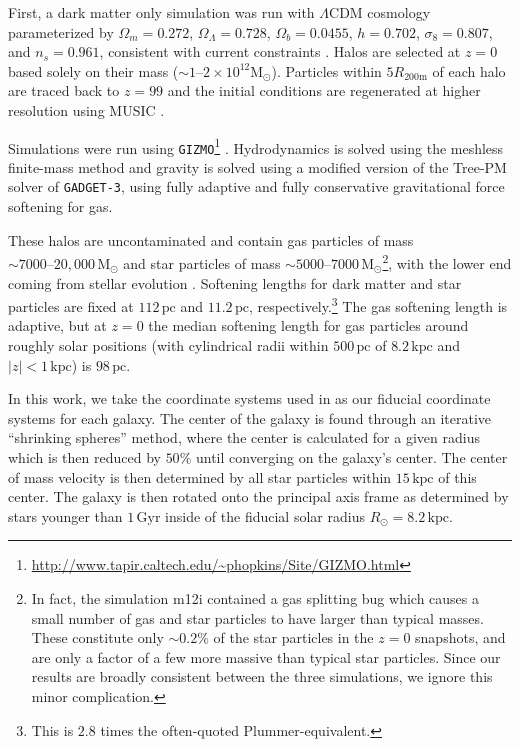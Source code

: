 \documentclass[twocolumn]{aastex62}
\newcommand{\Msun}{\text{M}_\odot}
\newcommand{\pc}{\text{pc}}
\newcommand{\kpc}{\text{kpc}}
\newcommand{\Gyr}{\text{Gyr}}
\newcommand{\abs}[1]{\left| #1 \right|}
\newcommand{\z}{z}
\begin{document}
First, a dark matter only simulation was run with $\Lambda$CDM cosmology
parameterized by $\Omega_m = 0.272$, $\Omega_{\Lambda} = 0.728$, $\Omega_b =
0.0455$, $h = 0.702$, $\sigma_8 = 0.807$, and $n_s = 0.961$, consistent with
current constraints \citep{2018arXiv180706209P}. Halos are selected at $z=0$
based solely on their mass ($\sim 1\text{--}2 \times 10^{12} \Msun$).
Particles within $5 R_{200\text{m}}$ of each halo are traced back to $\z=99$
and the initial conditions are regenerated at higher resolution using MUSIC
\citep{2011MNRAS.415.2101H}.

Simulations were run using
\texttt{GIZMO}\footnote{\url{http://www.tapir.caltech.edu/~phopkins/Site/GIZMO.html}}
\citep{2015MNRAS.450...53H}. Hydrodynamics is solved using the meshless
finite-mass method and gravity is solved using a modified version of the
Tree-PM solver of \texttt{GADGET-3}, using fully adaptive and fully
conservative gravitational force softening for gas.

These halos are uncontaminated and contain gas particles of mass $\sim 7000
\text{--} 20,000\,\Msun$ and star particles of mass $\sim 5000 \text{--} 7000\,
\Msun$\footnote{In fact, the simulation m12i contained a gas
splitting bug which causes a small number of gas and star particles to have
larger than typical masses. These constitute only $\sim0.2\%$ of the star
particles in the $z=0$ snapshots, and are only a factor of a few more massive
than typical star particles. Since our results are broadly consistent between
the three simulations, we ignore this minor complication.}, with the lower end
coming from stellar evolution \citep{2018arXiv180610564S}. Softening lengths
for dark matter and star particles are fixed at $112\,\pc$ and $11.2\,\pc$,
respectively.\footnote{This is $2.8$ times the often-quoted
Plummer-equivalent.} The gas softening length is adaptive, but at $z=0$ the
median softening length for gas particles around roughly solar positions (with
cylindrical radii within $500\,\pc$ of $8.2\,\kpc$ and $\abs{z}<1\,\kpc$) is
$98\,\pc$.

In this work, we take the coordinate systems used in
\citet{2018arXiv180610564S} as our fiducial coordinate systems for each
galaxy. The center of the galaxy is found through an iterative ``shrinking
spheres'' method, where the center is calculated for a given radius which is
then reduced by $50\%$ until converging on the galaxy's center. The center of
mass velocity is then determined by all star particles within $15\,\kpc$ of
this center. The galaxy is then rotated onto the principal axis frame as
determined by stars younger than $1\,\Gyr$ inside of the fiducial solar radius
$R_{\odot} = 8.2\,\kpc$.
\end{document}
